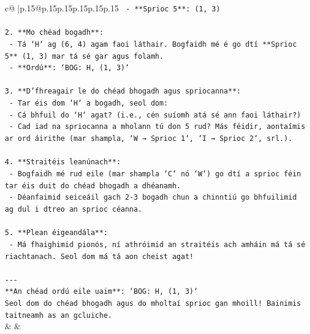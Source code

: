 \documentclass{article}
\begin{document}
{\begin{supertabular}{c@{$\;$}|p{.15\linewidth}@{}p{.15\linewidth}p{.15\linewidth}p{.15\linewidth}p{.15\linewidth}p{.15\linewidth}}
{{{\texttt{     {-} **Sprioc 5**: (1, 3)} \\
\\ 
\texttt{2. **Mo chéad bogadh**:} \\
\texttt{   {-} Tá `H` ag (6, 4) agam faoi láthair. Bogfaidh mé é go dtí **Sprioc 5** (1, 3) mar tá sé gar agus folamh.} \\
\texttt{   {-} **Ordú**: `BOG: H, (1, 3)`} \\
\\ 
\texttt{3. **D’fhreagair le do chéad bhogadh agus spriocanna**:} \\
\texttt{   {-} Tar éis dom `H` a bogadh, seol dom:} \\
\texttt{     {-} Cá bhfuil do `H` agat? (i.e., cén suíomh atá sé ann faoi láthair?)} \\
\texttt{     {-} Cad iad na spriocanna a mholann tú don 5 rud? Más féidir, aontaímis ar ord áirithe (mar shampla, `W → Sprioc 1`, `I → Sprioc 2`, srl.).} \\
\\ 
\texttt{4. **Straitéis leanúnach**:} \\
\texttt{   {-} Bogfaidh mé rud eile (mar shampla `C` nó `W`) go dtí a sprioc féin tar éis duit do chéad bhogadh a dhéanamh.} \\
\texttt{   {-} Déanfaimid seiceáil gach 2{-}3 bogadh chun a chinntiú go bhfuilimid ag dul i dtreo an sprioc céanna.} \\
\\ 
\texttt{5. **Plean éigeandála**:} \\
\texttt{   {-} Má fhaighimid pionós, ní athróimid an straitéis ach amháin má tá sé riachtanach. Seol dom má tá aon cheist agat!} \\
\\ 
\texttt{{-}{-}{-}} \\
\texttt{**An chéad ordú eile uaim**: `BOG: H, (1, 3)`} \\
\texttt{Seol dom do chéad bhogadh agus do mholtaí sprioc gan mhoill! Bainimis taitneamh as an gcluiche.} \\
            }
        }
    }
    & & \\ \\


\end{supertabular}}
\end{document}
